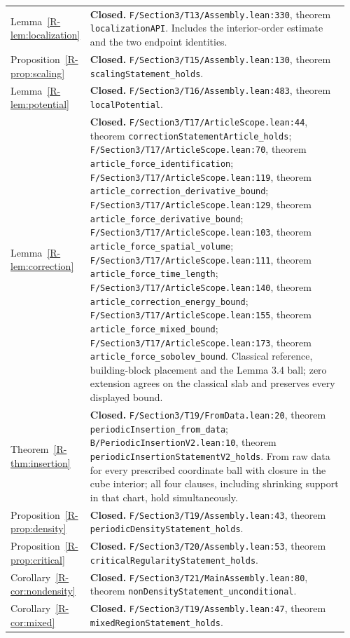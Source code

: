 \documentclass[11pt,a4paper]{article}
\newcommand{\code}[1]{\nolinkurl{#1}}
\newcommand{\paperref}[1]{\ref{R-#1}}
\newcommand{\source}[4]{\code{#1.lean:#2}, #4 \code{#3}}
\newcommand{\mapped}[2]{#1~\paperref{#2}}
\newcommand{\coverage}[1]{\textbf{#1.} }
\begin{document}
\begin{longtable}{@{}>{\raggedright\arraybackslash}p{0.20\linewidth}>{\raggedright\arraybackslash}p{0.76\linewidth}@{}}
\mapped{Lemma}{lem:localization} & \coverage{Closed}\source{F/Section3/T13/Assembly}{330}{localizationAPI}{theorem}. Includes the interior-order estimate and the two endpoint identities. \\
\mapped{Proposition}{prop:scaling} & \coverage{Closed}\source{F/Section3/T15/Assembly}{130}{scalingStatement_holds}{theorem}. \\
\mapped{Lemma}{lem:potential} & \coverage{Closed}\source{F/Section3/T16/Assembly}{483}{localPotential}{theorem}. \\
\mapped{Lemma}{lem:correction} & \coverage{Closed}\source{F/Section3/T17/ArticleScope}{44}{correctionStatementArticle_holds}{theorem};
\source{F/Section3/T17/ArticleScope}{70}{article_force_identification}{theorem};
\source{F/Section3/T17/ArticleScope}{119}{article_correction_derivative_bound}{theorem};
\source{F/Section3/T17/ArticleScope}{129}{article_force_derivative_bound}{theorem};
\source{F/Section3/T17/ArticleScope}{103}{article_force_spatial_volume}{theorem};
\source{F/Section3/T17/ArticleScope}{111}{article_force_time_length}{theorem};
\source{F/Section3/T17/ArticleScope}{140}{article_correction_energy_bound}{theorem};
\source{F/Section3/T17/ArticleScope}{155}{article_force_mixed_bound}{theorem};
\source{F/Section3/T17/ArticleScope}{173}{article_force_sobolev_bound}{theorem}.
Classical reference, building-block placement and the Lemma 3.4 ball; zero extension agrees on the classical slab and preserves every displayed bound. \\
\mapped{Theorem}{thm:insertion} & \coverage{Closed}\source{F/Section3/T19/FromData}{20}{periodicInsertion_from_data}{theorem};
\source{B/PeriodicInsertionV2}{10}{periodicInsertionStatementV2_holds}{theorem}.
From raw data for every prescribed coordinate ball with closure in the cube interior;
all four clauses, including shrinking support in that chart, hold simultaneously. \\
\mapped{Proposition}{prop:density} & \coverage{Closed}\source{F/Section3/T19/Assembly}{43}{periodicDensityStatement_holds}{theorem}. \\
\mapped{Proposition}{prop:critical} & \coverage{Closed}\source{F/Section3/T20/Assembly}{53}{criticalRegularityStatement_holds}{theorem}. \\
\mapped{Corollary}{cor:nondensity} & \coverage{Closed}\source{F/Section3/T21/MainAssembly}{80}{nonDensityStatement_unconditional}{theorem}. \\
\mapped{Corollary}{cor:mixed} & \coverage{Closed}\source{F/Section3/T19/Assembly}{47}{mixedRegionStatement_holds}{theorem}. \\

\end{longtable}
\end{document}
